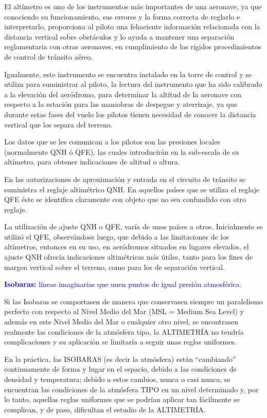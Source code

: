 \documentclass[a4paper,12pt,twoside]{article}
\begin{document}
El altímetro es uno de los instrumentos más importantes de una aeronave, 
ya que conociendo su funcionamiento, sus errores y la
forma correcta de reglarlo e interpretarlo, proporciona al piloto una
fehaciente informaci\'on relacionada con la distancia
vertical sobre obstáculos y lo ayuda a mantener una
separaci\'on reglamentaria con otras aeronaves, en cumplimiento de los rígidos
procedimientos de control de tránsito aéreo.

Igualmente, este instrumento se encuentra instalado en la torre de control y se utiliza para
suministrar al piloto, la lectura del instrumento que ha sido calibrado a la elevaci\'on del
aer\'odromo, para determinar la altitud de la aeronave con respecto a la estaci\'on para las
maniobras de despegue y aterrizaje, ya que durante estas fases del vuelo los pilotos tienen
necesidad de conocer la distancia vertical que los separa del terreno.

Los datos que se les comunican a los pilotos son las presiones locales (normalmente QNH \'o
QFE), las cuales introducirán en la sub-escala de su altímetro, para obtener indicaciones
de altitud o altura.

En las autorizaciones de aproximaci\'on y entrada en el circuito de tránsito se suministra el
reglaje altimétrico QNH. En aquellos países que se utiliza el reglaje QFE éste se identifica
claramente con objeto que no sea confundido con otro reglaje.

La utilizaci\'on de ajuste QNH o QFE, varía de unos países a otros. Inicialmente se utiliz\'o el
QFE, observándose luego, que debido a las limitaciones de los altímetros, entonces en su
uso, en aer\'odromos situados en lugares elevados, el ajuste QNH ofrecía indicaciones
altimétricas más útiles, tanto para los fines de margen vertical sobre el terreno, como para
los de separaci\'on vertical. %

\textcolor{blue}{{\bf Isobaras:} líneas imaginarias que unen puntos de igual presi\'on atmosférica.}

Si las Isobaras se comportasen
de manera que conservasen
siempre un paralelismo perfecto con respecto al Nivel Medio del Mar (MSL = Medium Sea Level)
 y además en
este Nivel Medio del Mar o cualquier otro nivel, se encontrasen realmente las condiciones
de la atm\'osfera tipo, la ALTIMETRÍA no tendría complicaciones y su aplicaci\'on se
limitaría a seguir unas reglas uniformes.

En la práctica, las ISOBARAS (es decir la atm\'osfera) están ``cambiando''
continuamente de forma y lugar en el espacio, debido a las condiciones de densidad y
temperatura; debido a estos cambios, nunca o casi nunca, se encuentran las condiciones de
la atm\'osfera TIPO en un nivel determinado y, por lo tanto, aquellas reglas uniformes que se
podrían aplicar tan fácilmente se complican, y de paso, dificultan el estudio de la
ALTIMETRÍA.
\end{document}
